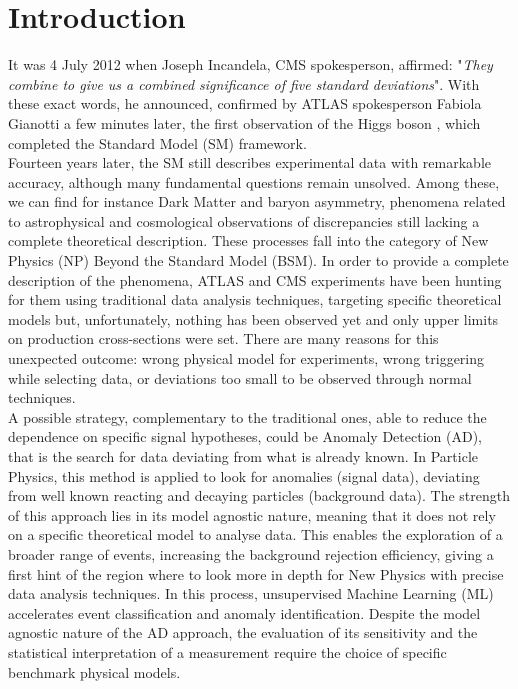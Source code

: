 \chapter*{Introduction}

It was 4 July 2012 when Joseph Incandela, CMS spokesperson, affirmed: "\textit{They combine to give us a combined significance of five standard deviations}". 
With these exact words, he announced, confirmed by ATLAS spokesperson Fabiola Gianotti a few minutes later, the first observation of the Higgs boson \cite{HiggsDiscoveryATLAS,HiggsDiscoveryCMS}, which completed the Standard Model (SM) framework.\\ 
Fourteen years later, the SM still describes experimental data with remarkable accuracy, although many fundamental questions remain unsolved.
Among these, we can find for instance Dark Matter \cite{DM_Garrett} and baryon asymmetry, phenomena related to astrophysical and cosmological observations of discrepancies still lacking a complete theoretical description.
These processes fall into the category of New Physics (NP) Beyond the Standard Model (BSM). 
In order to provide a complete description of the phenomena, ATLAS and CMS experiments have been hunting for them using traditional data analysis techniques, targeting specific theoretical models but, unfortunately, nothing has been observed yet and only upper limits on production cross-sections were set. 
There are many reasons for this unexpected outcome: wrong physical model for experiments, wrong triggering while selecting data, or deviations too small to be observed through normal techniques.\\
A possible strategy, complementary to the traditional ones, able to reduce the dependence on specific signal hypotheses, could be Anomaly Detection (AD), that is the search for data deviating from what is already known. 
In Particle Physics, this method is applied to look for anomalies (signal data), deviating from well known reacting and decaying particles (background data). 
The strength of this approach lies in its model agnostic nature, meaning that it does not rely on a specific theoretical model to analyse data. 
This enables the exploration of a broader range of events, increasing the background rejection efficiency, giving a first hint of the region where to look more in depth for New Physics with precise data analysis techniques. 
In this process, unsupervised Machine Learning (ML) accelerates event classification and anomaly identification.
Despite the model agnostic nature of the AD approach, the evaluation of its sensitivity and the statistical interpretation of a measurement require the choice of specific benchmark physical models.\\

